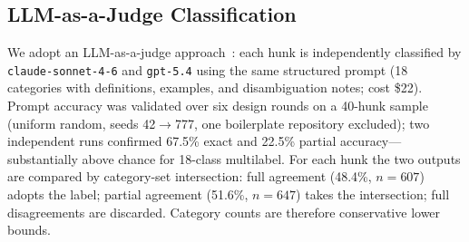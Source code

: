 \documentclass[runningheads]{llncs}
\begin{document}

\subsection{LLM-as-a-Judge Classification}
\label{subsec:classification}

We adopt an LLM-as-a-judge approach~\cite{zheng2023judging}: each hunk is
independently classified by \texttt{claude-sonnet-4-6} and \texttt{gpt-5.4}
using the same structured prompt (18 categories with definitions, examples,
and disambiguation notes; cost \$22). Prompt accuracy was validated over six
design rounds on a 40-hunk sample (uniform random, seeds 42$\to$777, one
boilerplate repository excluded); two independent runs confirmed 67.5\%
exact and 22.5\% partial accuracy---substantially above chance for 18-class
multilabel. For each hunk the two outputs are compared by category-set
intersection: full agreement (48.4\%, $n{=}607$) adopts the label; partial
agreement (51.6\%, $n{=}647$) takes the intersection; full disagreements
are discarded. Category counts are therefore conservative lower bounds.

\end{document}
